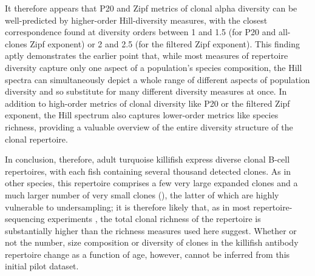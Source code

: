 It therefore appears that P20 and Zipf metrics of clonal alpha diversity can be well-predicted by higher-order Hill-diversity measures, with the closest correspondence found at diversity orders between 1 and 1.5 (for P20 and all-clones Zipf exponent) or 2 and 2.5 (for the filtered Zipf exponent). This finding aptly demonstrates the earlier point that, while most measures of repertoire diversity capture only one aspect of a population's species composition, the Hill spectra can simultaneously depict a whole range of different aspects of population diversity and so substitute for many different diversity measures at once. In addition to high-order metrics of clonal diversity like P20 or the filtered Zipf exponent, the Hill spectrum also captures lower-order metrics like species richness, providing a valuable overview of the entire diversity structure of the clonal repertoire.

In conclusion, therefore, adult turquoise killifish express diverse clonal B-cell repertoires, with each fish containing several thousand detected clones. As in other species, this repertoire comprises a few very large expanded clones and a much larger number of very small clones (), the latter of which are highly vulnerable to undersampling; it is therefore likely that, as in most repertoire-sequencing experiments \parencite{mora2016diversity}, the total clonal richness of the repertoire is substantially higher than the richness measures used here suggest. Whether or not the number, size composition or diversity of clones in the killifish antibody repertoire change as a function of age, however, cannot be inferred from this initial pilot dataset.

